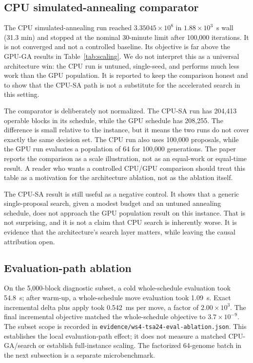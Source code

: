 \documentclass[preprint,11pt]{elsarticle}
\begin{document}
\subsection{CPU simulated-annealing comparator}

The CPU simulated-annealing run reached $3.35045\times10^8$ in $1.88\times10^3$~s wall
(31.3 min) and stopped at the nominal 30-minute limit after 100,000 iterations. It is not converged and
not a controlled baseline. Its objective is far above the GPU-GA results in
Table~\ref{tab:scaling}. We do not interpret this as a universal architecture
win: the CPU run is untuned, single-seed, and performs much less work than the
GPU population. It is reported to keep the comparison honest and to show that
the CPU-SA path is not a substitute for the accelerated search in this setting.

The comparator is deliberately not normalized. The CPU-SA run has 204,413 operable blocks in its
schedule, while the GPU schedule has 208,255. The difference is small relative to the instance, but it
means the two runs do not cover exactly the same decision set. The CPU run also uses 100,000 proposals,
while the GPU run evaluates a population of 64 for 100,000 generations. The paper reports the
comparison as a scale illustration, not as an equal-work or equal-time result. A reader who wants a
controlled CPU/GPU comparison should treat this table as a motivation for the architecture ablation,
not as the ablation itself.

The CPU-SA result is still useful as a negative control. It shows that a generic single-proposal
search, given a modest budget and an untuned annealing schedule, does not approach the GPU population
result on this instance. That is not surprising, and it is not a claim that CPU search is inherently
worse. It is evidence that the architecture's search layer matters, while leaving the causal
attribution open.

\subsection{Evaluation-path ablation}

On the 5,000-block diagnostic subset, a cold whole-schedule evaluation took
54.8~s; after warm-up, a whole-schedule move evaluation took 1.09~s. Exact
incremental delta plus apply took 0.542~ms per move, a factor of $2.00\times10^3$. The final
incremental objective matched the whole-schedule objective to
$3.7\times10^{-9}$. The subset scope is recorded in
\texttt{evidence/ws4-tsa24-eval-ablation.json}. This establishes the local
evaluation-path effect; it does not measure a matched CPU-GA/search or establish full-instance
scaling. The factorized 64-genome batch in the next subsection is a separate microbenchmark.
\end{document}
